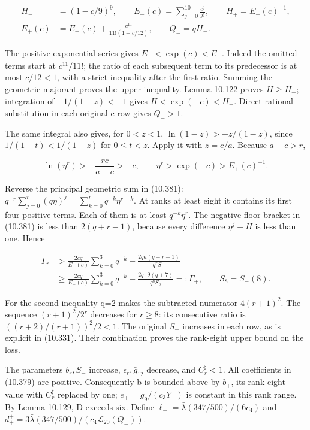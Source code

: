 \documentclass[
  11pt,
  a4paper,
]{article}
\begin{document}
\[
\begin{aligned}
H_-&=(1-c/9)^9,\qquad
E_-(c)=\sum_{j=0}^{10}\frac{c^j}{j!},\qquad H_+=E_-(c)^{-1},\\
E_+(c)&=E_-(c)+\frac{c^{11}}{11!(1-c/12)},\qquad Q_-=qH_-.
\end{aligned}
\tag{10.386}
\]

The positive exponential series gives \(E_-<\exp(c)<E_+\). Indeed the
omitted terms start at \(c^{11}/11!\); the ratio of each subsequent term
to its predecessor is at most \(c/12<1\), with a strict inequality after
the first ratio. Summing the geometric majorant proves the upper
inequality. Lemma 10.122 proves \(H\ge H_-\); integration of
\(-1/(1-z)<-1\) gives \(H<\exp(-c)<H_+\). Direct rational substitution
in each original c row gives \(Q_->1\).

The same integral also gives, for \(0<z<1\), \(\ln(1-z)>-z/(1-z)\),
since \(1/(1-t)<1/(1-z)\) for \(0\le t<z\). Apply it with \(z=c/a\).
Because \(a-c>r\),

\[
\ln(\eta^r)>-\frac{rc}{a-c}>-c,
\qquad \eta^r>\exp(-c)>E_+(c)^{-1}.
\tag{10.387}
\]

Reverse the principal geometric sum in (10.381):
\(q^{-r}\sum_{j=0}^r(q\eta)^j=\sum_{k=0}^r q^{-k}\eta^{r-k}\). At ranks
at least eight it contains its first four positive terms. Each of them
is at least \(q^{-k}\eta^r\). The negative floor bracket in (10.381) is
less than \(2(q+r-1)\), because every difference \(\eta^j-H\) is less
than one. Hence

\[
\begin{aligned}
\Gamma_r&>
\frac{2cq}{E_+(c)}\sum_{k=0}^3q^{-k}
-\frac{2qa(q+r-1)}{q^rS_-}\\
&\ge
\frac{2cq}{E_+(c)}\sum_{k=0}^3q^{-k}
-\frac{2q\cdot9(q+7)}{q^8S_8}
=:\Gamma_+,
\qquad S_8=S_-(8).
\end{aligned}
\tag{10.388}
\]

For the second inequality q=2 makes the subtracted numerator
\(4(r+1)^2\). The sequence \((r+1)^2/2^r\) decreases for \(r\ge8\): its
consecutive ratio is \(((r+2)/(r+1))^2/2<1\). The original \(S_-\)
increases in each row, as is explicit in (10.331). Their combination
proves the rank-eight upper bound on the loss.

The parameters \(b_r,S_-\) increase, \(\epsilon_r,\bar g_{12}\)
decrease, and \(C_r^{\sharp}<1\). All coefficients in (10.379) are
positive. Consequently b is bounded above by \(b_+\), its rank-eight
value with \(C_r^{\sharp}\) replaced by one; \(e_+=\bar g_9/(c_3Y_-)\)
is constant in this rank range. By Lemma 10.129, D exceeds six. Define
\(\ell_+=\bar\lambda(347/500)/(6c_4)\) and
\(d_+^+=3\bar\lambda(347/500)/(c_4\mathcal L_{20}(Q_-))\).
\end{document}
